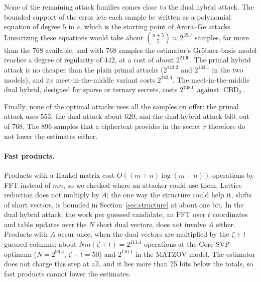 \documentclass[11pt,a4paper]{article}
\theoremstyle{definition}
\newcommand{\CBD}{\operatorname{CBD}}
\begin{document}
None of the remaining attack families comes close to the dual hybrid attack. The bounded support of the error lets each sample be written as a polynomial equation of degree $5$ in $s$, which is the starting point of Arora--Ge attacks. Linearizing these equations would take about $\binom{n+5}{5} \approx 2^{39.7}$ samples, far more than the 768 available, and with 768 samples the estimator's Gr\"obner-basis model reaches a degree of regularity of $442$, at a cost of about $2^{2100}$. The primal hybrid attack is no cheaper than the plain primal attacks ($2^{143.2}$ and $2^{163.1}$ in the two models), and its meet-in-the-middle variant costs $2^{283.4}$. The meet-in-the-middle dual hybrid, designed for sparse or ternary secrets, costs $2^{748.0}$ against $\CBD_2$.

Finally, none of the optimal attacks uses all the samples on offer: the primal attack uses 553, the dual attack about 620, and the dual hybrid attack 640, out of 768. The 896 samples that a ciphertext provides in the secret $r$ therefore do not lower the estimates either.

\paragraph{Fast products.} Products with a Hankel matrix cost $O((m + n)\log(m + n))$ operations by FFT instead of $mn$, so we checked where an attacker could use them. Lattice reduction does not multiply by $A$; the one way the structure could help it, shifts of short vectors, is bounded in Section~\ref{sec:structure} at about one bit. In the dual hybrid attack, the work per guessed candidate, an FFT over $t$ coordinates and table updates over the $N$ short dual vectors, does not involve $A$ either. Products with $A$ occur once, when the dual vectors are multiplied by the $\zeta + t$ guessed columns: about $N m (\zeta + t) = 2^{111.4}$ operations at the Core-SVP optimum ($N = 2^{96.4}$, $\zeta + t = 50$) and $2^{110.1}$ in the MATZOV model. The estimator does not charge this step at all, and it lies more than 25 bits below the totals, so fast products cannot lower the estimates.
\end{document}
